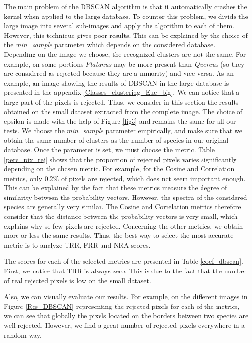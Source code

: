 \documentclass{siamart171218}
\begin{document}
The main problem of the DBSCAN algorithm is that it automatically crashes the kernel when applied to the large database. To counter this problem, we divide the large image into several sub-images and apply the algorithm to each of them. However, this technique gives poor results. This can be explained by the choice of the \textit{min\_sample} parameter which depends on the considered database. Depending on the image we choose, the recognized clusters are not the same. For example, on some portions \textit{Platanus} may be more present than \textit{Quercus} (so they are considered as rejected because they are a minority) and vice versa. As an example, an image showing the results of DBSCAN in the large database is presented in the appendix \ref{Classes_clustering_Euc_big}. We can notice that a large part of the pixels is rejected. 
Thus, we consider in this section the results obtained on the small dataset extracted from the complete image. 
The choice of epsilon is made with the help of Figure  \ref{fig3} and remains the same for all our tests. We choose the \textit{min\_sample} parameter empirically, and make sure that we obtain the same number of clusters as the number of species in our original database. Once the parameter is set, we must choose the metric. Table \ref{perc_pix_rej} shows that the proportion of rejected pixels varies significantly depending on the chosen metric. For example, for the Cosine and Correlation metrics, only 0.2\% of pixels are rejected, which does not seem important enough. This can be explained by the fact that these metrics measure the degree of similarity between the probability vectors. However, the spectra of the considered species  are generally very similar. The Cosine and Correlation metrics therefore consider that the distance between the probability vectors is very small, which explains why so few pixels are rejected. 
Concerning the other metrics, we obtain more or less the same results. Thus, the best way to select the most accurate metric is to analyze TRR, FRR and NRA scores.  

The scores for each of the selected metrics are presented in Table \ref{coef_dbscan}. First, we notice that TRR is always zero. This is due to the fact that the number of real rejected pixels is low on the small dataset.

Also, we can visually evaluate our results. For example, on the different images in Figure \ref{Res_DBSCAN} representing the rejected pixels for each of the metrics, we can see that globally the pixels located on the borders between two species are well rejected. However, we find a great number of rejected pixels everywhere in a random way. 
\end{document}
